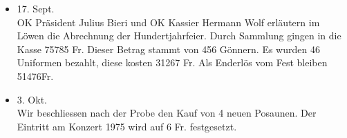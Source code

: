 \begin{history}
\begin{itemize}
        \item[]17. Sept.\\
        OK Präsident Julius Bieri und OK Kassier Hermann Wolf erläutern im Löwen
        die Abrechnung der Hundertjahrfeier. Durch Sammlung gingen in die Kasse
        75785 Fr. Dieser Betrag stammt von 456 Gönnern. Es wurden 46 Uniformen
        bezahlt, diese kosten 31267 Fr. Als Enderlös vom Fest bleiben 51476Fr.

        \item[]3. Okt.\\
        Wir beschliessen nach der Probe den Kauf von 4 neuen Posaunen. Der
        Eintritt am Konzert 1975 wird auf 6 Fr. festgesetzt.

    \end{itemize}

\end{history}
